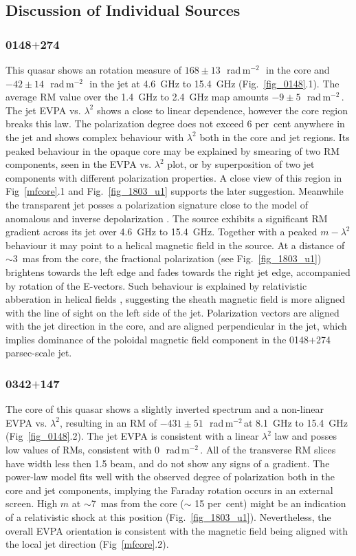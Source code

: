 \documentclass[a4paper,fleqn,usenatbib,useAMS]{mnras}
\newcommand{\rmu}{\,rad\,m$^{-2}$\,} %
\begin{document}
\subsection{Discussion of Individual Sources}
\label{s:inds}

\subsubsection{0148$+$274}
This quasar shows an rotation measure of $168\pm13$~\rmu\ in the core and $-42\pm14$~\rmu\ in the jet at 4.6~GHz to 15.4~GHz (Fig.~\ref{fig_0148}.1). 
The average RM value over the 1.4~GHz to 2.4~GHz map amounts $-9\pm5$~\rmu. 
The jet EVPA vs. $\lambda^2$ shows a close to linear dependence, however the core region breaks this law. 
The polarization degree does not exceed 6 per~cent anywhere in the jet and shows complex behaviour with $\lambda^2$ both in the core and jet regions. 
Its peaked behaviour in the opaque core may be explained by smearing of two RM components, seen in the EVPA vs. $\lambda^2$ plot, or by superposition of two jet components with different polarization properties. 
A close view of this region in Fig~\ref{mfcore}.1 and Fig.~\ref{fig_1803_u1} supports the later suggestion. 
Meanwhile the transparent jet posses a polarization signature close to the model of anomalous and inverse depolarization \citep{sokoloff_etal98,homan_12}.
The source exhibits a significant RM gradient across its jet over 4.6~GHz to 15.4~GHz. 
Together with a peaked $m-\lambda^2$ behaviour it may point to a helical magnetic field in the source.
At a distance of $\sim$3~mas from the core, the fractional polarization (see Fig.~\ref{fig_1803_u1}) brightens towards the left edge and fades towards the right jet edge, accompanied by rotation of the E-vectors. 
Such behaviour is explained by relativistic abberation in helical fields \citep{clausen_etal11}, suggesting the sheath magnetic field is more aligned with the line of sight on the left side of the jet.
Polarization vectors are aligned with the jet direction in the core, and are aligned perpendicular in the jet, which implies dominance of the poloidal magnetic field component in the 0148$+$274 parsec-scale jet.

\subsubsection{0342$+$147}
The core of this quasar shows a slightly inverted spectrum and a non-linear EVPA vs. $\lambda^2$, resulting in an RM of $-431\pm51$~\rmu at 8.1~GHz to 15.4~GHz (Fig~\ref{fig_0148}.2). 
The jet EVPA is consistent with a linear $\lambda^2$ law and posses low values of RMs, consistent with 0~\rmu. 
All of the transverse RM slices have width less then 1.5 beam, and do not show any signs of a gradient.
The power-law model fits well with the observed degree of polarization both in the core and jet components, implying the Faraday rotation occurs in an external screen. 
High $m$ at $\sim$7~mas from the core ($\sim$ 15 per~cent) might be an indication of a relativistic shock \citep{2009MNRAS.395..524N} at this position (Fig.~\ref{fig_1803_u1}). 
Nevertheless, the overall EVPA orientation is consistent with the magnetic field being aligned with the local jet direction (Fig~\ref{mfcore}.2).
\end{document}
